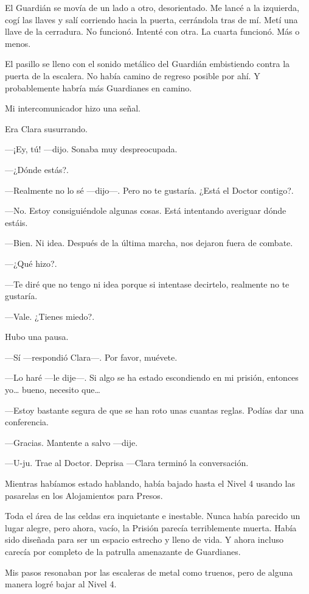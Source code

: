 El Guardián se movía de un lado a otro, desorientado. Me lancé a la
izquierda, cogí las llaves y salí corriendo hacia la puerta, cerrándola
tras de mí. Metí una llave de la cerradura. No funcionó. Intenté con
otra. La cuarta funcionó. Más o menos.

El pasillo se lleno con el sonido metálico del Guardián embistiendo
contra la puerta de la escalera. No había camino de regreso posible por
ahí. Y probablemente habría más Guardianes en camino.

Mi intercomunicador hizo una señal.

Era Clara susurrando.

---¡Ey, tú! ---dijo. Sonaba muy despreocupada.

---¿Dónde estás?.

---Realmente no lo sé ---dijo---. Pero no te gustaría. ¿Está el Doctor
contigo?.

---No. Estoy consiguiéndole algunas cosas. Está intentando averiguar
dónde estáis.

---Bien. Ni idea. Después de la última marcha, nos dejaron fuera de
combate.

---¿Qué hizo?.

---Te diré que no tengo ni idea porque si intentase decirtelo, realmente
no te gustaría.

---Vale. ¿Tienes miedo?.

Hubo una pausa.

---Sí ---respondió Clara---. Por favor, muévete.

---Lo haré ---le dije---. Si algo se ha estado escondiendo en mi
prisión, entonces yo\ldots{} bueno, necesito que\ldots{}

---Estoy bastante segura de que se han roto unas cuantas reglas. Podías
dar una conferencia.

---Gracias. Mantente a salvo ---dije.

---U-ju. Trae al Doctor. Deprisa ---Clara terminó la conversación.

Mientras habíamos estado hablando, había bajado hasta el Nivel 4 usando
las pasarelas en los Alojamientos para Presos.

Toda el área de las celdas era inquietante e inestable. Nunca había
parecido un lugar alegre, pero ahora, vacío, la Prisión parecía
terriblemente muerta. Había sido diseñada para ser un espacio estrecho y
lleno de vida. Y ahora incluso carecía por completo de la patrulla
amenazante de Guardianes.

Mis pasos resonaban por las escaleras de metal como truenos, pero de
alguna manera logré bajar al Nivel 4.

